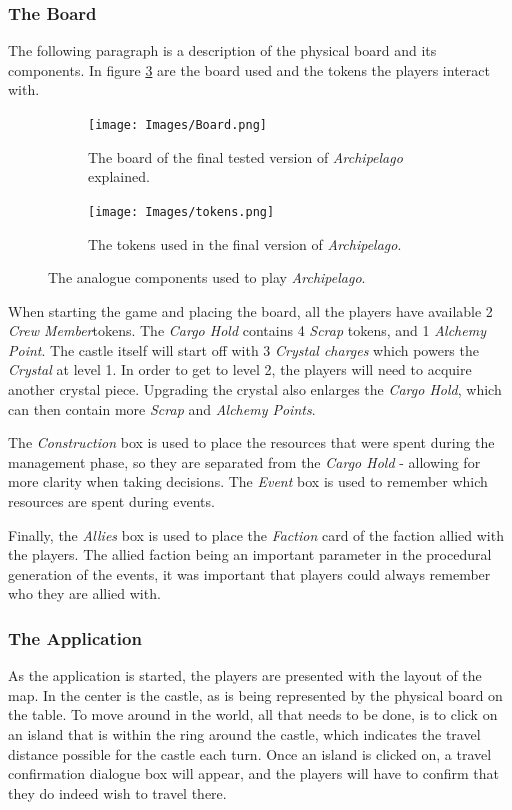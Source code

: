 \subsubsection{The Board}
The following paragraph is a description of the physical board and its components. In figure \ref{fig:compo} are the board used and the tokens the players interact with.
\begin{figure}[!ht]
   \centering
   \begin{subfigure}[b]{\textwidth}
       \texttt{[image: Images/Board.png]}
       \caption{The board of the final tested version of \textit{Archipelago} explained.}
       \label{fig:boardfinal}
   \end{subfigure}
   \begin{subfigure}[b]{\textwidth}
       \texttt{[image: Images/tokens.png]}
       \caption{The tokens used in the final version of \textit{Archipelago}.}
       \label{fig:tokens}
   \end{subfigure}
   \caption{The analogue components used to play \textit{Archipelago}.}
   \label{fig:compo}
\end{figure}

When starting the game and placing the board, all the players have available 2 \textit{Crew Member}tokens. The \textit{Cargo Hold} contains 4 \textit{Scrap} tokens, and 1 \textit{Alchemy Point}. The castle itself will start off with 3 \textit{Crystal charges} which powers the \textit{Crystal} at level 1. In order to get to level 2, the players will need to acquire another crystal piece. Upgrading the crystal also enlarges the \textit{Cargo Hold}, which can then contain more \textit{Scrap} and \textit{Alchemy Points}.

The \textit{Construction} box is used to place the resources that were spent during the management phase, so they are separated from the \textit{Cargo Hold} - allowing for more clarity when taking decisions. The \textit{Event} box is used to remember which resources are spent during events. 

Finally, the \textit{Allies} box is used to place the \textit{Faction} card of the faction allied with the players. The allied faction being an important parameter in the procedural generation of the events, it was important that players could always remember who they are allied with. 
\subsubsection{The Application}
As the application is started, the players are presented with the layout of the map. In the center is the castle, as is being represented by the physical board on the table. To move around in the world, all that needs to be done, is to click on an island that is within the ring around the castle, which indicates the travel distance possible for the castle each turn. Once an island is clicked on, a travel confirmation dialogue box will appear, and the players will have to confirm that they do indeed wish to travel there.
